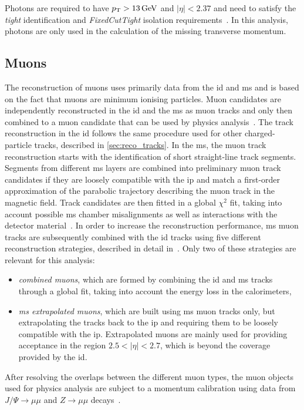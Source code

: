 Photons are required to have $p_{\textrm{T}} > \SI{13}{GeV}$ and $\vert\eta\vert<2.37$ and need to satisfy the \textit{tight} identification and \textit{FixedCutTight} isolation requirements~\cite{EGAM-2018-01}. In this analysis, photons are only used in the calculation of the missing transverse momentum.

\subsection{Muons}

The reconstruction of muons uses primarily data from the \gls{id} and \gls{ms} and is based on the fact that muons are minimum ionising particles. Muon candidates are independently reconstructed in the \gls{id} and the \gls{ms} as muon tracks and only then combined  to a muon candidate that can be used by physics analysis~\cite{PERF-2015-10,Aad:2020gmm}. The track reconstruction in the \gls{id} follows the same procedure used for other charged-particle tracks, described in \cref{sec:reco_tracks}. In the \gls{ms}, the muon track reconstruction starts with the identification of short straight-line track segments. Segments from different \gls{ms} layers are combined into preliminary muon track candidates if they are loosely compatible with the \gls{ip} and match a first-order approximation of the parabolic trajectory describing the muon track in the magnetic field. Track candidates are then fitted in a global $\chi^2$ fit, taking into account possible \gls{ms} chamber misalignments as well as interactions with the detector material~\cite{Aad:2020gmm}. In order to increase the reconstruction performance, \gls{ms} muon tracks are subsequently combined with the \gls{id} tracks using five different reconstruction strategies, described in detail in~\cite{Aad:2020gmm}. Only two of these strategies are relevant for this analysis:
\begin{itemize}
	\item \textit{combined muons}, which are formed by combining the \gls{id} and \gls{ms} tracks through a global fit, taking into account the energy loss in the calorimeters,
	\item \textit{\gls{ms} extrapolated muons}, which are built using \gls{ms} muon tracks only, but extrapolating the tracks back to the \gls{ip} and requiring them to be loosely compatible with the \gls{ip}. Extrapolated muons are mainly used for providing acceptance in the region $2.5 < \vert\eta\vert < 2.7$, which is beyond the coverage provided by the \gls{id}.
\end{itemize}
After resolving the overlaps between the different muon types, the muon objects used for physics analysis are subject to a momentum calibration using data from $J/\Psi\rightarrow\mu\mu$ and $Z\rightarrow\mu\mu$ decays~\cite{PERF-2015-10,Aad:2020gmm}.

